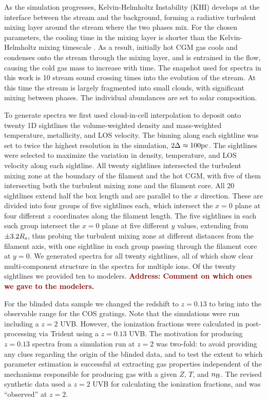 \documentclass[fleqn,usenatbib]{mnras}
\newcommand{\todo}[1]{\textcolor{Maroon}{\textbf{Address: #1}}}
\begin{document}
As the simulation progresses, Kelvin-Helmholtz Instability (KHI) develops at the interface between the stream and the background, forming a radiative turbulent mixing layer around the stream where the two phases mix.
For the chosen parameters, the cooling time in the mixing layer is shorter than the Kelvin-Helmholtz mixing timescale \citep{Mandelker2020a}.
As a result, initially hot CGM gas cools and condenses onto the stream through the mixing layer, and is entrained in the flow, causing the cold gas mass to increase with time.
The snapshot used for spectra in this work is 10 stream sound crossing times into the evolution of the stream.
At this time the stream is largely fragmented into small clouds, with significant mixing between phases.
The individual abundances are set to solar composition.

To generate spectra we first used cloud-in-cell interpolation to deposit onto twenty 1D sightlines the volume-weighted density and mass-weighted temperature, metallicity, and LOS velocity.
The binning along each sightline was set to twice the highest resolution in the simulation, $2\Delta \approx 100{\rm pc}$.
The sightlines were selected to maximize the variation in density, temperature, and LOS velocity along each sightline.
All twenty sightlines intersected the turbulent mixing zone at the boundary of the filament and the hot CGM, with five of them intersecting both the turbulent mixing zone and the filament core.
All 20 sightlines extend half the box length and are parallel to the $x$ direction.
These are divided into four groups of five sightlines each, which intersect the $x=0$ plane at four different $z$ coordinates along the filament length.
The five sightlines in each such group intersect the $x=0$ plane at five different $y$ values, extending from $\pm 3.2R_{\rm s}$, thus probing the turbulent mixing zone at different distances from the filament axis, with one sightline in each group passing through the filament core at $y=0$.
We generated spectra for all twenty sightlines, all of which show clear multi-component structure in the spectra for multiple ions.
Of the twenty sightlines we provided ten to modelers.
\todo{Comment on which ones we gave to the modelers.}

For the blinded data sample we changed the redshift to $z=0.13$ to bring  into the observable range for the COS gratings.
Note that the simulations were run including a $z=2$ UVB.
However, the ionization fractions were calculated in post-processing via Trident using a $z=0.13$ \cite{Haardt2012} UVB.
The motivation for producing $z=0.13$ spectra from a simulation run at $z=2$ was two-fold:
to avoid providing any clues regarding the origin of the blinded data,
and to test the extent to which parameter estimation is successful at extracting gas properties independent of the mechanisms responsible for producing gas with a given $Z$, $T$, and $n_{\rm H}$.
The revised synthetic data used a $z=2$ UVB for calculating the ionization fractions, and was ``observed'' at $z=2$.
\end{document}

